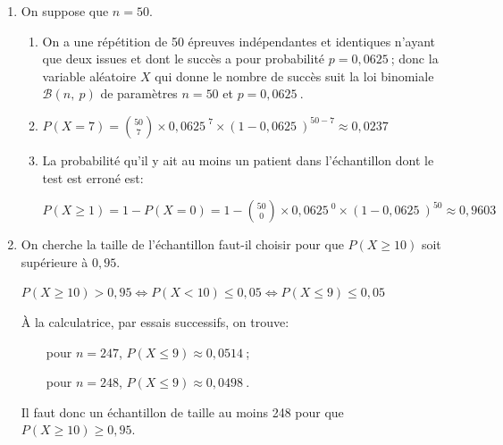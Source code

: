 \documentclass[10pt]{article}
\providecommand{\np}[2][]{{#2~#1}}
\providecommand{\ds}{\displaystyle}
\begin{document}
\begin{enumerate}
\item On suppose que $n = 50$.
	\begin{enumerate}
		\item 
On a une répétition de 50 épreuves indépendantes et identiques n'ayant que deux issues et dont le succès a pour probabilité $p=\np{0,0625}$; donc la variable aléatoire $X$ qui donne le nombre de succès suit la loi binomiale $\mathcal{B}(n,\: p)$ de paramètres $n = 50$ et $p = \np{0,0625}.$
		
		\item $P(X = 7) = \ds\binom{50}{7}\times \np{0,0625}^{7}\times (1-\np{0,0625})^{50-7}\approx \np{0,0237}$
		
		\item La probabilité qu'il y ait au moins un patient dans l'échantillon dont le test est erroné est:
		
$P(X\geqslant 1) = 1-P(X=0) = 1- \ds\binom{50}{0}\times \np{0,0625}^0\times (1-\np{0,0625})^{50}\approx \np{0,9603}$		
		
	\end{enumerate}	
\item On cherche la taille de l'échantillon faut-il choisir pour que $P(X \geqslant 10)$ soit supérieure à $0,95$.

$P(X \geqslant 10)>0,95 \iff P(X < 10) \leqslant 0,05 \iff P(X \leqslant 9) \leqslant 0,05$

À la calculatrice, par essais successifs, on trouve:

~~\textbullet~~pour $n=247$, $P(X\leqslant 9) \approx \np{0,0514}$;

~~\textbullet~~pour $n=248$, $P(X\leqslant 9) \approx \np{0,0498}$.

Il faut donc un échantillon de taille au moins 248 pour que $P(X\geqslant 10)\geqslant 0,95$.

\end{enumerate}

\bigskip
\end{document}

